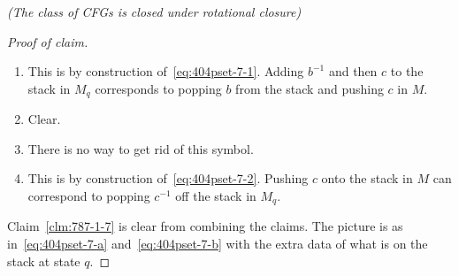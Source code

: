 \begin{problem}{\it(The class of CFGs is closed under rotational closure)}
\begin{proof}[Proof of claim]
\begin{enumerate}
Intuitively, putting an inverse symbol above a symbol in the original language means we're claiming to remove stuff we didn't know was on the stack, when we already have stuff we know to be on the stack, which doesn't make sense. 
\item
This is by construction of~\eqref{eq:404pset-7-1}. Adding $b^{-1}$ and then $c$ to the stack in $M_q$ corresponds to popping $b$ from the stack and pushing $c$ in $M$.
\item
Clear.
\item
There is no way to get rid of this symbol.
\item
This is by construction of~\eqref{eq:404pset-7-2}. Pushing $c$ onto the stack in $M$ can correspond to popping $c^{-1}$ off the stack in $M_q$.
\end{enumerate}
%
%
Claim~\ref{clm:787-1-7} is clear from combining the claims. The picture is as in~\eqref{eq:404pset-7-a} and~\eqref{eq:404pset-7-b} with the extra data of what is on the stack at state $q$.
\end{proof}
\end{problem}



